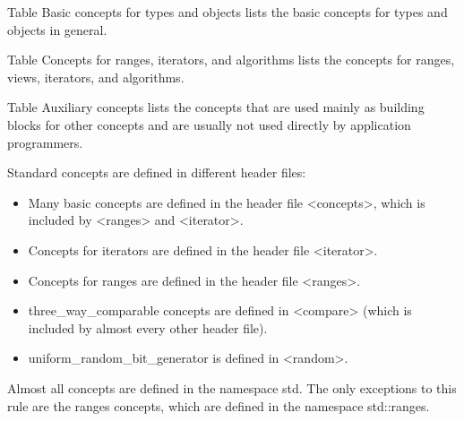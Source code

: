 
Table Basic concepts for types and objects lists the basic concepts for types and objects in general.

Table Concepts for ranges, iterators, and algorithms lists the concepts for ranges, views, iterators, and algorithms.

Table Auxiliary concepts lists the concepts that are used mainly as building blocks for other concepts and are usually not used directly by application programmers.


Standard concepts are defined in different header files:

\begin{itemize}
\item
Many basic concepts are defined in the header file <concepts>, which is included by <ranges> and <iterator>.

\item
Concepts for iterators are defined in the header file <iterator>.

\item
Concepts for ranges are defined in the header file <ranges>.

\item
three\_way\_comparable concepts are defined in <compare> (which is included by almost every other header file).

\item
uniform\_random\_bit\_generator is defined in <random>.
\end{itemize}

Almost all concepts are defined in the namespace std. The only exceptions to this rule are the ranges concepts, which are defined in the namespace std::ranges.

